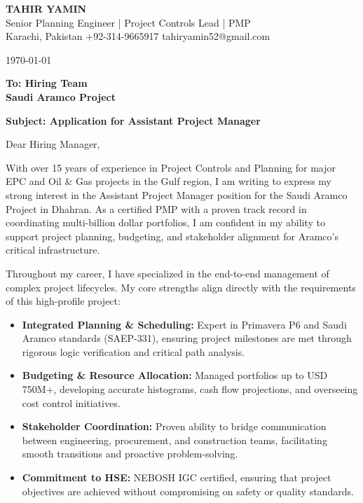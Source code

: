 \documentclass[11pt,a4paper]{article}
\begin{document}
\begin{center}
    {\Huge \textbf{\color{awesome-darknight} TAHIR YAMIN}} \\[0.2cm]
    {\Large \color{awesome-gray} Senior Planning Engineer | Project Controls Lead | PMP} \\[0.3cm]
    
    \small \color{light-gray}
    Karachi, Pakistan \quad \textbullet \quad 
    +92-314-9665917 \quad \textbullet \quad 
    tahiryamin52@gmail.com
\end{center}

\vspace{0.8cm}
\today
\vspace{0.5cm}

\textbf{To: Hiring Team} \\
\textbf{Saudi Aramco Project} \\
\vspace{0.5cm}

\textbf{Subject: Application for Assistant Project Manager}

\vspace{0.5cm}

Dear Hiring Manager,

With over 15 years of experience in Project Controls and Planning for major EPC and Oil \& Gas projects in the Gulf region, I am writing to express my strong interest in the Assistant Project Manager position for the Saudi Aramco Project in Dhahran. As a certified PMP with a proven track record in coordinating multi-billion dollar portfolios, I am confident in my ability to support project planning, budgeting, and stakeholder alignment for Aramco's critical infrastructure.

Throughout my career, I have specialized in the end-to-end management of complex project lifecycles. My core strengths align directly with the requirements of this high-profile project:

\begin{itemize}
    \item \textbf{Integrated Planning \& Scheduling:} Expert in Primavera P6 and Saudi Aramco standards (SAEP-331), ensuring project milestones are met through rigorous logic verification and critical path analysis.
    \item \textbf{Budgeting \& Resource Allocation:} Managed portfolios up to USD 750M+, developing accurate histograms, cash flow projections, and overseeing cost control initiatives.
    \item \textbf{Stakeholder Coordination:} Proven ability to bridge communication between engineering, procurement, and construction teams, facilitating smooth transitions and proactive problem-solving.
    \item \textbf{Commitment to HSE:} NEBOSH IGC certified, ensuring that project objectives are achieved without compromising on safety or quality standards.
\end{itemize}
\end{document}
